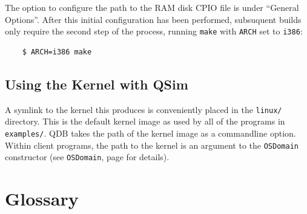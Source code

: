 \documentclass[letterpaper, 10pt]{book}
\begin{document}
The option to configure the path to the RAM disk CPIO file is under ``General
Options''. After this initial configuration has been performed, subsuquent
builds only require the second step of the process, running \texttt{make} with
\texttt{ARCH} set to \texttt{i386}:

\begin{verbatim}
    $ ARCH=i386 make
\end{verbatim}

\section{Using the Kernel with QSim}
A symlink to the kernel this produces is conveniently placed in the
\texttt{linux/} directory. This is the default kernel image as used by all of
the programs in \texttt{examples/}. QDB takes the path of the kernel image as a
commandline option. Within client programs, the path to the kernel is an
argument to the \texttt{OSDomain} constructor (see \texttt{OSDomain}, page 
\pageref{class:OSDomain} for details).

\chapter*{Glossary}
\end{document}
